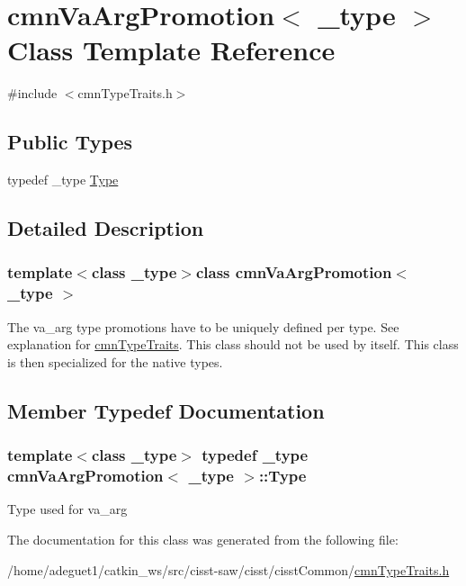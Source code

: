 \hypertarget{classcmn_va_arg_promotion}{\section{cmn\-Va\-Arg\-Promotion$<$ \-\_\-type $>$ Class Template Reference}
\label{classcmn_va_arg_promotion}
}


{\ttfamily \#include $<$cmn\-Type\-Traits.\-h$>$}

\subsection*{Public Types}
\begin{DoxyCompactItemize}
\item 
typedef \-\_\-type \hyperlink{classcmn_va_arg_promotion_aeb4fd516094432431f659afa58113a8c}{Type}
\end{DoxyCompactItemize}


\subsection{Detailed Description}
\subsubsection*{template$<$class \-\_\-type$>$class cmn\-Va\-Arg\-Promotion$<$ \-\_\-type $>$}

The va\-\_\-arg type promotions have to be uniquely defined per type. See explanation for \hyperlink{classcmn_type_traits}{cmn\-Type\-Traits}. This class should not be used by itself. This class is then specialized for the native types. 

\subsection{Member Typedef Documentation}
\hypertarget{classcmn_va_arg_promotion_aeb4fd516094432431f659afa58113a8c}{
\subsubsection[{Type}]{\setlength{\rightskip}{0pt plus 5cm}template$<$class \-\_\-type$>$ typedef \-\_\-type {\bf cmn\-Va\-Arg\-Promotion}$<$ \-\_\-type $>$\-::{\bf Type}}}\label{classcmn_va_arg_promotion_aeb4fd516094432431f659afa58113a8c}
Type used for va\-\_\-arg 

The documentation for this class was generated from the following file\-:\begin{DoxyCompactItemize}
\item 
/home/adeguet1/catkin\-\_\-ws/src/cisst-\/saw/cisst/cisst\-Common/\hyperlink{cmn_type_traits_8h}{cmn\-Type\-Traits.\-h}\end{DoxyCompactItemize}
